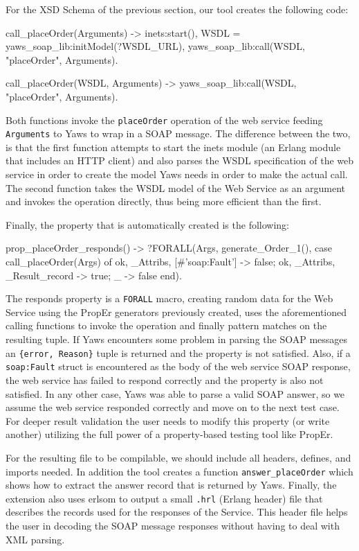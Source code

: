 \documentclass[submission,copyright]{eptcs}
\begin{document}
For the XSD Schema of the previous section, our tool creates the following code:
\begin{lsterlang}[firstnumber=38]
call_placeOrder(Arguments) ->
  inets:start(),
  WSDL = yaws_soap_lib:initModel(?WSDL_URL),
  yaws_soap_lib:call(WSDL, "placeOrder", Arguments).
    
call_placeOrder(WSDL, Arguments) ->
  yaws_soap_lib:call(WSDL, "placeOrder", Arguments).
\end{lsterlang}
Both functions invoke the \texttt{placeOrder} operation of the
web service feeding \texttt{Arguments} to Yaws to wrap in a SOAP
message. The difference between the two, is that the first function
attempts to start the inets module (an Erlang module that includes an
HTTP client) and also parses the WSDL specification of the web service
in order to create the model Yaws needs in order to make the actual
call. The second function takes the WSDL model of the Web Service as
an argument and invokes the operation directly, thus being more
efficient than the first.

Finally, the property that is automatically created is the following:
\begin{lsterlang}[firstnumber=46]
prop_placeOrder_responds() ->
  ?FORALL(Args, generate_Order_1(),
          case call_placeOrder(Args) of 
            {ok, _Attribs, [#'soap:Fault'{}]} -> false;
            {ok, _Attribs, _Result_record} -> true;
            _ -> false
          end).
\end{lsterlang}

The responds property is a \texttt{FORALL} macro, creating random data
for the Web Service using the PropEr generators previously created,
uses the aforementioned calling functions to invoke the operation and
finally pattern matches on the resulting tuple. If Yaws encounters
some problem in parsing the SOAP messages an \texttt{\{error,
  Reason\}} tuple is returned and the property is not satisfied. Also,
if a \texttt{soap:Fault} struct is encountered as the body of the web
service SOAP response, the web service has failed to respond correctly
and the property is also not satisfied. In any other case, Yaws was
able to parse a valid SOAP answer, so we assume the web service
responded correctly and move on to the next test case. For deeper
result validation the user needs to modify this property (or write
another) utilizing the full power of a property-based testing tool
like PropEr.

For the resulting file to be compilable, we should include all
headers, defines, and imports needed. In addition the tool creates a
function \texttt{answer\_placeOrder} which shows how to extract the
answer record that is returned by Yaws. Finally, the extension also
uses erlsom to output a small \texttt{.hrl} (Erlang header) file that
describes the records used for the responses of the Service. This
header file helps the user in decoding the SOAP message responses
without having to deal with XML parsing.
\end{document}
